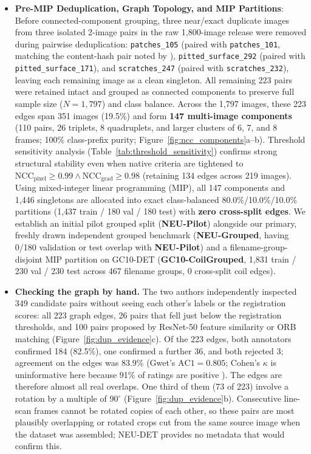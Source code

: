 \documentclass[pdflatex,sn-apa]{sn-jnl}
\begin{document}
\begin{itemize}[leftmargin=2em]
    \item \textbf{Pre-MIP Deduplication, Graph Topology, and MIP Partitions}: Before connected-component grouping, three near/exact duplicate images from three isolated 2-image pairs in the raw 1,800-image release were removed during pairwise deduplication: \texttt{patches\_105} (paired with \texttt{patches\_101}, matching the content-hash pair noted by \citealp{chen2026confidence}), \texttt{pitted\_surface\_292} (paired with \texttt{pitted\_surface\_171}), and \texttt{scratches\_247} (paired with \texttt{scratches\_232}), leaving each remaining image as a clean singleton. All remaining 223 pairs were retained intact and grouped as connected components to preserve full sample size ($N=1,797$) and class balance. Across the 1,797 images, these 223 edges span 351 images (19.5\%) and form \textbf{147 multi-image components} (110 pairs, 26 triplets, 8 quadruplets, and larger clusters of 6, 7, and 8 frames; 100\% class-prefix purity; Figure~\ref{fig:ncc_components}a--b). Threshold sensitivity analysis (Table~\ref{tab:threshold_sensitivity}) confirms strong structural stability even when native criteria are tightened to $\text{NCC}_{\text{pixel}}\ge 0.99 \land \text{NCC}_{\text{grad}}\ge 0.98$ (retaining 134 edges across 219 images). Using mixed-integer linear programming (MIP), all 147 components and 1,446 singletons are allocated into exact class-balanced 80.0\%/10.0\%/10.0\% partitions (1,437 train / 180 val / 180 test) with \textbf{zero cross-split edges}. We establish an initial pilot grouped split (\textbf{NEU-Pilot}) alongside our primary, freshly drawn independent grouped benchmark (\textbf{NEU-Grouped}, having 0/180 validation or test overlap with \textbf{NEU-Pilot}) and a filename-group-disjoint MIP partition on GC10-DET (\textbf{GC10-CoilGrouped}, 1,831 train / 230 val / 230 test across 467 filename groups, 0 cross-split coil edges).
    \item \textbf{Checking the graph by hand.} The two authors independently inspected 349 candidate pairs without seeing each other's labels or the registration scores: all 223 graph edges, 26 pairs that fell just below the registration thresholds, and 100 pairs proposed by ResNet-50 feature similarity or ORB matching (Figure~\ref{fig:dup_evidence}c). Of the 223 edges, both annotators confirmed 184 (82.5\%), one confirmed a further 36, and both rejected 3; agreement on the edges was 83.9\% (Gwet's $\text{AC1}=0.805$; Cohen's $\kappa$ is uninformative here because 91\% of ratings are positive \citep{gwet2008computing}). The edges are therefore almost all real overlaps. One third of them (73 of 223) involve a rotation by a multiple of $90^{\circ}$ (Figure~\ref{fig:dup_evidence}b). Consecutive line-scan frames cannot be rotated copies of each other, so these pairs are most plausibly overlapping or rotated crops cut from the same source image when the dataset was assembled; NEU-DET provides no metadata that would confirm this.

\end{itemize}
\end{document}
